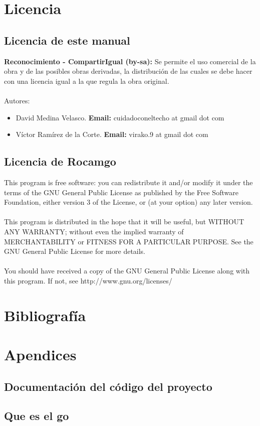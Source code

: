 \documentclass[12pt,a4paper]{report}
\begin{document}
\chapter{Licencia}

\section{Licencia de este manual}

\textbf{Reconocimiento - CompartirIgual (by-sa):} Se permite el uso comercial de la obra y de las posibles obras derivadas, la distribución de las cuales se debe hacer con una licencia igual a la que regula la obra original. \\ \\


Autores: 
\begin{itemize}
\item David Medina Velasco. \textbf{Email:} cuidadoconeltecho at gmail dot com 
\item Víctor Ramírez de la Corte. \textbf{Email:} virako.9 at gmail dot com
\end{itemize}

\section{Licencia de Rocamgo}

This program is free software: you can redistribute it and/or modify it under the terms of the GNU General Public License as published by the Free Software Foundation, either version 3 of the License, or (at your option) any later version. \\
\\
This program is distributed in the hope that it will be useful, but WITHOUT ANY WARRANTY; without even the implied warranty of MERCHANTABILITY or FITNESS FOR A PARTICULAR PURPOSE.  See the GNU General Public License for more details. \\
\\
You should have received a copy of the GNU General Public License along with this program.  If not, see http://www.gnu.org/licenses/



\chapter{Bibliografía}


\chapter{Apendices}
\section{Documentación del código del proyecto}
\section{Que es el go}
\end{document}

